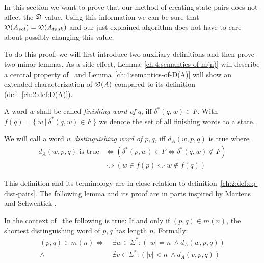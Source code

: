 In this section we want to prove that our method of creating state pairs does not affect the $\mathfrak{D}$-value. Using this information we can be sure that $\mathfrak{D}(A_{sol}) = \mathfrak{D}(A_{task})$ and our just explained algorithm does not have to care about possibly changing this value.

To do this proof, we will first introduce two auxiliary definitions and then prove two minor lemmas. As a side effect, Lemma~\ref{ch:4:semantics-of-m(n)} will describe a central property of \CompDist\ and Lemma~\ref{ch:4:semantics-of-D(A)} will show an extended characterization of $\mathfrak{D}(A)$ compared to its definition (def.~\ref{ch:2:def:D(A)}).

A word $w$ shall be called \emph{finishing word of $q$}, iff $\delta^*(q, w) \in F$. With $f(q) = \{\ w\ |\ \delta^*(q, w) \in F\ \}$ we denote the set of all finishing words to a state.
\begin{definition} \label{ch:4:def-dist-word}
	We will call a word $w$ \emph{distinguishing word of $p,q$}, iff $d_A(w, p, q)$ is true where
	\begin{align*}
	d_A(w, p, q) \text{ is true} &\Leftrightarrow (\delta^*(p,w) \in F \Leftrightarrow \delta^*(q,w) \notin F) \\
	&\Leftrightarrow (w \in f(p) \Leftrightarrow w \notin f(q))
	\end{align*}
\end{definition}
\noindent This definition and its terminology are in close relation to definition~\ref{ch:2:def:eq-dist-pairs}. The following lemma and its proof are in parts inspired by Martens and Schwentick \cite[ch.\ 4 p.\ 18]{MS18}.

\begin{lemma}\label{ch:4:semantics-of-m(n)}
    In the context of \CompDist\ the following is true: If and only if $(p,q)\in m(n)$, the shortest distinguishing word of $p,q$ has length $n$. Formally:
    \begin{align*}
        (p,q) \in m(n) \Longleftrightarrow\ &\exists w\in\Sigma^*\colon (|w| = n\ \land d_A(w, p, q))\\
        \land\ &\nexists v\in\Sigma^*\colon (|v| < n\ \land d_A(v, p, q))
    \end{align*}
\end{lemma}

